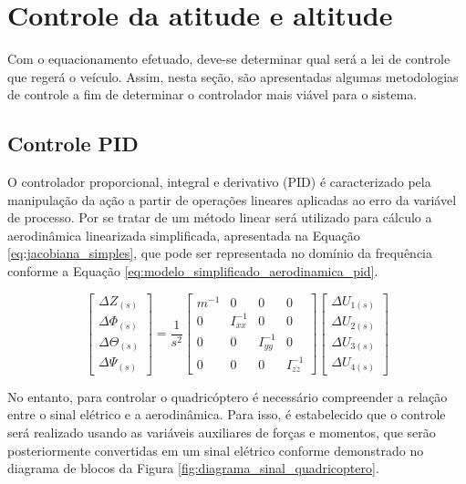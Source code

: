 \documentclass[main.tex]{subfiles}
\begin{document}
\chapter{Controle da atitude e altitude}\label{chap:controle}

Com o equacionamento efetuado, deve-se determinar qual será a lei de controle que regerá o veículo. Assim, nesta seção, são apresentadas algumas metodologias de controle a fim de determinar o controlador mais viável para o sistema.

\section{Controle PID}

O controlador proporcional, integral e derivativo (PID) é caracterizado pela manipulação da ação a partir de operações lineares aplicadas ao erro da variável de processo. Por se tratar de um método linear será utilizado para cálculo a aerodinâmica linearizada simplificada, apresentada na Equação \ref{eq:jacobiana_simples}, que pode ser representada no domínio da frequência conforme a Equação \ref{eq:modelo_simplificado_aerodinamica_pid}.

\begin{equation}\label{eq:modelo_simplificado_aerodinamica_pid}
	\begin{bmatrix}
		\Delta Z_{(s)}\\
		\Delta \Phi_{(s)}\\
		\Delta \Theta_{(s)}\\
		\Delta \Psi_{(s)}
	\end{bmatrix} = \frac{1}{s^2}\begin{bmatrix}
		m^{-1} & 0 & 0 & 0\\
		
		0 & I_{xx}^{-1} & 0 & 0\\
		
		0 & 0 & I_{yy}^{-1} & 0\\
		
		0 & 0 & 0 & I_{zz}^{-1}
	\end{bmatrix}\begin{bmatrix}
		\Delta U_{1(s)}\\
		\Delta U_{2(s)}\\
		\Delta U_{3(s)}\\
		\Delta U_{4(s)}
	\end{bmatrix}
\end{equation}

No entanto, para controlar o quadricóptero é necessário compreender a relação entre o sinal elétrico e a aerodinâmica. Para isso, é estabelecido que o controle será realizado usando as variáveis auxiliares de forças e momentos, que serão posteriormente convertidas em um sinal elétrico conforme demonstrado no diagrama de blocos da Figura \ref{fig:diagrama_sinal_quadricoptero}.
\end{document}
